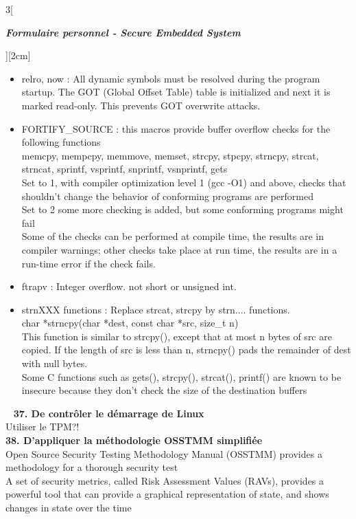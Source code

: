 \begin{multicols}{3}[\centerline{ \large\em \textbf{Formulaire personnel - Secure Embedded System}}][2cm]
\begin{itemize}
\item relro, now : All dynamic symbols must be resolved during the program startup. The GOT (Global Offset Table) table is initialized and next it is marked read-only. This prevents GOT overwrite attacks.
\item FORTIFY\_SOURCE : this macros provide buffer overflow checks for the following functions \\
memcpy, mempcpy, memmove, memset, strcpy, stpcpy, strncpy, strcat, strncat, sprintf, vsprintf, snprintf, vsnprintf, gets\\
Set to 1, with compiler optimization level 1 (gcc -O1) and above,
checks that shouldn’t change the behavior of conforming programs are performed\\
Set to 2 some more checking is added, but some conforming programs might fail\\
Some of the checks can be performed at compile time, the results are in compiler warnings; other checks take place at run time, the results are in a run-time error if the check fails. 
\item ftrapv : Integer overflow. not short or unsigned int.
\item strnXXX functions : Replace strcat, strcpy by strn.... functions. \\
char *strncpy(char *dest, const char *src, size\_t n)\\
This function is similar to strcpy(), except that at most n bytes of src are copied. If the length of src is less than n, strncpy() pads the remainder of dest with null bytes. \\
Some C functions such as gets(), strcpy(), strcat(), printf() are known to be
insecure because they don’t check the size of the destination buffers
\end{itemize}~
\textbf{37. De contrôler le démarrage de Linux\\}
Utiliser le TPM?!
\\ \textbf{38. D’appliquer la méthodologie OSSTMM simplifiée\\}
Open Source Security Testing Methodology Manual (OSSTMM) provides a
methodology for a thorough security test\\
A set of security metrics, called Risk Assessment Values (RAVs), provides a
powerful tool that can provide a graphical representation of state, and shows
changes in state over the time\\
\begin{minipage}{\linewidth}
	\centering

\end{minipage}
\end{multicols}
